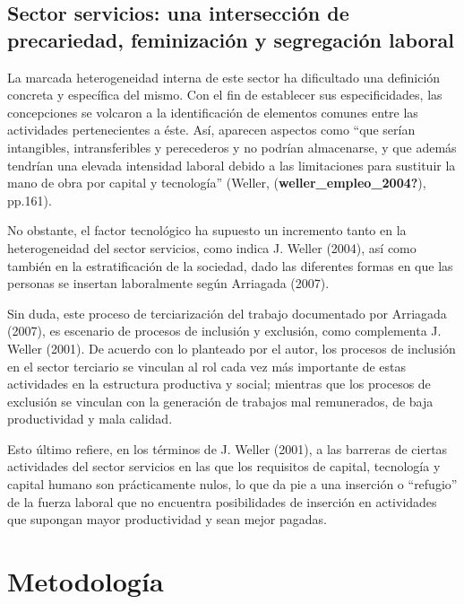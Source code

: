 \documentclass[
]{article}
\begin{document}
\hypertarget{sector-servicios-una-intersecciuxf3n-de-precariedad-feminizaciuxf3n-y-segregaciuxf3n-laboral}{%
\subsection{Sector servicios: una intersección de precariedad,
feminización y segregación
laboral}\label{sector-servicios-una-intersecciuxf3n-de-precariedad-feminizaciuxf3n-y-segregaciuxf3n-laboral}}

La marcada heterogeneidad interna de este sector ha dificultado una
definición concreta y específica del mismo. Con el fin de establecer sus
especificidades, las concepciones se volcaron a la identificación de
elementos comunes entre las actividades pertenecientes a éste. Así,
aparecen aspectos como ``que serían intangibles, intransferibles y
perecederos y no podrían almacenarse, y que además tendrían una elevada
intensidad laboral debido a las limitaciones para sustituir la mano de
obra por capital y tecnología'' (Weller,
(\textbf{weller\_empleo\_2004?}), pp.161).

No obstante, el factor tecnológico ha supuesto un incremento tanto en la
heterogeneidad del sector servicios, como indica J. Weller (2004), así
como también en la estratificación de la sociedad, dado las diferentes
formas en que las personas se insertan laboralmente según Arriagada
(2007).

Sin duda, este proceso de terciarización del trabajo documentado por
Arriagada (2007), es escenario de procesos de inclusión y exclusión,
como complementa J. Weller (2001). De acuerdo con lo planteado por el
autor, los procesos de inclusión en el sector terciario se vinculan al
rol cada vez más importante de estas actividades en la estructura
productiva y social; mientras que los procesos de exclusión se vinculan
con la generación de trabajos mal remunerados, de baja productividad y
mala calidad.

Esto último refiere, en los términos de J. Weller (2001), a las barreras
de ciertas actividades del sector servicios en las que los requisitos de
capital, tecnología y capital humano son prácticamente nulos, lo que da
pie a una inserción o ``refugio'' de la fuerza laboral que no encuentra
posibilidades de inserción en actividades que supongan mayor
productividad y sean mejor pagadas.

\hypertarget{metodologuxeda}{%
\section{Metodología}\label{metodologuxeda}}
\end{document}
